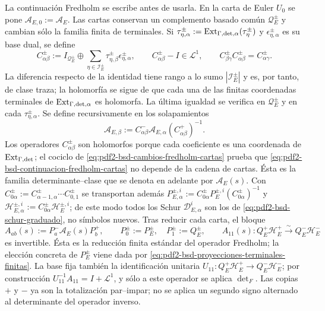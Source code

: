 La continuación Fredholm se escribe antes de usarla. En la carta de Euler
$U_0$ se pone $\mathscr A_{E,0}:=\mathscr A_E$. Las cartas conservan un
complemento basado común $\mathscr Q_E^\pm$ y cambian sólo la familia finita
de terminales. Si
$\tau_{\eta,\alpha}^\pm:=
\operatorname{Ext}_{\Gamma,{\rm det},\alpha}(\tau_\eta^\pm)$ y
$\epsilon_{\eta,\alpha}^\pm$ es su base dual, se define
\begin{equation}\label{eq:pdf2-bsd-cambios-fredholm-cartas}
 C_{\alpha\beta}^\pm:=
 I_{\mathscr Q_E^\pm}\oplus
 \sum_{\eta\in\mathcal I_E^\pm}
 \tau_{\eta,\beta}^\pm\epsilon_{\eta,\alpha}^\pm,
 \qquad C_{\alpha\beta}^\pm-I\in\mathcal L^1,
 \qquad
 C_{\beta\gamma}^\pm C_{\alpha\beta}^\pm=C_{\alpha\gamma}^\pm.
\end{equation}
La diferencia respecto de la identidad tiene rango a lo sumo
$|\mathcal I_E^\pm|$ y es, por tanto, de clase traza; la holomorfía se sigue
de que cada una de las finitas coordenadas terminales de
$\operatorname{Ext}_{\Gamma,{\rm det},\alpha}$ es holomorfa. La última
igualdad se verifica en $\mathscr Q_E^\pm$ y en cada
$\tau_{\eta,\alpha}^\pm$. Se define
recursivamente en los solapamientos
\begin{equation}\label{eq:pdf2-bsd-continuacion-fredholm-cartas}
 \mathscr A_{E,\beta}:=
 C_{\alpha\beta}^-\mathscr A_{E,\alpha}
 (C_{\alpha\beta}^+)^{-1}.
\end{equation}
Los operadores $C_{\alpha\beta}^\pm$ son holomorfos porque cada coeficiente
es una coordenada de $\operatorname{Ext}_{\Gamma,{\rm det}}$; el cociclo de
\eqref{eq:pdf2-bsd-cambios-fredholm-cartas} prueba que
\eqref{eq:pdf2-bsd-continuacion-fredholm-cartas} no depende de la cadena de
cartas. Ésta es la familia determinante--clase que se denota en adelante por
$\mathscr A_E(s)$. Con
$C_{0\alpha}^\pm:=C_{\alpha-1,\alpha}^\pm\cdots C_{0,1}^\pm$ se transportan
además
$P_{E,\alpha}^{\pm,i}:=
C_{0\alpha}^\pm P_E^{\pm,i}(C_{0\alpha}^\pm)^{-1}$ y
$\mathscr H_{E,\alpha}^{\pm,i}:=
C_{0\alpha}^\pm\mathscr H_E^{\pm,i}$; de este modo todos los Schur
$\mathscr D_{E,\alpha}^i$ son los de
\eqref{eq:pdf2-bsd-schur-graduado}, no símbolos nuevos. Tras reducir cada
carta, el bloque
\begin{equation}\label{eq:pdf2-bsd-bloques-fredholm}
 A_{ab}(s):=P_a^-\mathscr A_E(s)P_b^+,
 \qquad P_0^\pm:=P_E^\pm,\quad P_1^\pm:=Q_E^\pm,
 \qquad A_{11}(s):Q_E^+\mathscr H_E^+\xrightarrow{\sim}
                       Q_E^-\mathscr H_E^-
\end{equation}
es invertible. Ésta es la reducción finita estándar del operador Fredholm;
la elección concreta de $P_E^\pm$ viene dada por
\eqref{eq:pdf2-bsd-proyecciones-terminales-finitas}. La base fija también
la identificación unitaria
$U_{11}:Q_E^+\mathscr H_E^+\to Q_E^-\mathscr H_E^-$; por construcción
$U_{11}^{-1}A_{11}=I+\mathcal L^1$, y sólo a este operador se aplica
$\det_F$. Las copias $+$ y $-$ ya son la totalización par--impar; no se
aplica un segundo signo alternado al determinante del operador inverso.

